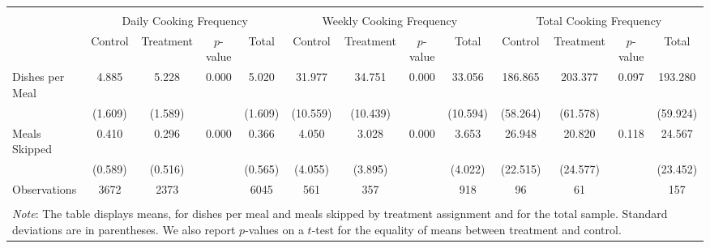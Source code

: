 \begin{tabular}{l*{12}{c}} \\ [-1.8ex]\hline \hline \\[-1.8ex] 
& \multicolumn{4}{c}{Daily Cooking Frequency} &  \multicolumn{4}{c}{Weekly Cooking Frequency} 
& \multicolumn{4}{c}{Total Cooking Frequency} \\ 
& \multicolumn{1}{c}{Control} & \multicolumn{1}{c}{Treatment} &  
\multicolumn{1}{c}{$p$-value} & \multicolumn{1}{c}{Total} 
& \multicolumn{1}{c}{Control} & \multicolumn{1}{c}{Treatment} &  
\multicolumn{1}{c}{$p$-value} & \multicolumn{1}{c}{Total} 
& \multicolumn{1}{c}{Control} & \multicolumn{1}{c}{Treatment} &  
\multicolumn{1}{c}{$p$-value} & \multicolumn{1}{c}{Total} \\ 
\midrule
Dishes per Meal&       4.885&       5.228&       0.000&       5.020&      31.977&      34.751&       0.000&      33.056&     186.865&     203.377&       0.097&     193.280\\
            &     (1.609)&     (1.589)&            &     (1.609)&    (10.559)&    (10.439)&            &    (10.594)&    (58.264)&    (61.578)&            &    (59.924)\\
Meals Skipped&       0.410&       0.296&       0.000&       0.366&       4.050&       3.028&       0.000&       3.653&      26.948&      20.820&       0.118&      24.567\\
            &     (0.589)&     (0.516)&            &     (0.565)&     (4.055)&     (3.895)&            &     (4.022)&    (22.515)&    (24.577)&            &    (23.452)\\
 \midrule Observations & 3672 & 2373 & & 6045 & 
  561 &  357 & &  918 &   96 &   61 & &  157 \\ 
\hline \hline \\[-1.8ex] \multicolumn{13}{J{\linewidth}}{\small 
\noindent \textit{Note}: The table displays means, for dishes per meal and meals skipped 
by treatment assignment and for the total sample. Standard deviations are in 
parentheses. We also report $p$-values 
on a $t$-test for the equality of means between treatment and control.}  \end{tabular}
